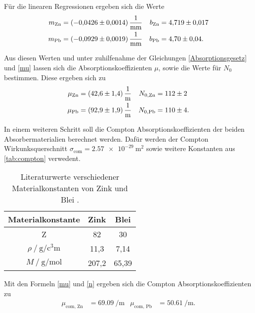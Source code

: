   Für die linearen Regressionen ergeben sich die Werte
  \begin{align*}
      m_{\text{Zn}} & = \qty{-0.0426+-0.0014}{\per\milli\metre} & b_{\text{Zn}} &= \num{4.719+-0.017} \\
      m_{\text{Pb}} & = \qty{-0.0929+-0.0019}{\per\milli\metre} & b_{\text{Pb}} &= \num{4.70+-0.04}. \\
  \end{align*}

  Aus diesen Werten und unter zuhilfenahme der Gleichungen \eqref{Absorptionsgesetz} und \eqref{mu} lassen sich die
  Absorptionskoeffizienten $\mu$, sowie die Werte für $N_0$ bestimmen. Diese ergeben sich zu
  \begin{align*}
    \mu_{\text{Zn}} & = \qty{42.6+-1.4}{\per\metre} & N_{0,\text{Zn}} &= \num{112+-2} \\
    \mu_{\text{Pb}} & = \qty{92.9+-1.9}{\per\metre} & N_{0,\text{Pb}} &= \num{110+-4}. \\
  \end{align*}

  In einem weiteren Schritt soll die Compton Absorptionskoeffizienten der beiden Absorbermaterialien berechnet werden.
  Dafür werden der Compton Wirkunksquerschnitt $\sigma_{\text{com}} = \qty{2.57e-29}{\metre\squared}$ sowie weitere 
  Konstanten aus \autoref{tab:compton} verwedent. 
  
\begin{table} [H]
    \centering
    \caption{Literaturwerte verschiedener Materialkonstanten von Zink und Blei \cite{Gestis}.}
    \label{tab:compton}
    \begin{tabular}{S S S}
      \toprule
      {Materialkonstante} & {Zink} & {Blei}  \\
      \midrule
      {Z}     & 82 & 30 \\
      $\rho \mathbin{/} \unit{\gram\per\cubic\centi\metre}$ & 11,3 & 7,14 \\
      $M \mathbin{/} \unit{\gram\per\mol}$ & 207,2 & 65,39 \\
      \bottomrule
    \end{tabular}
\end{table}

Mit den Formeln \eqref{mu} und \eqref{n} ergeben sich die Compton Absorptionskoeffizienten zu
\begin{align*}
    \mu_{\text{com, Zn}} &= \qty{69,09}{\per\metre} & \mu_{\text{com, Pb}} &= \qty{50,61}{\per\metre}.
\end{align*}